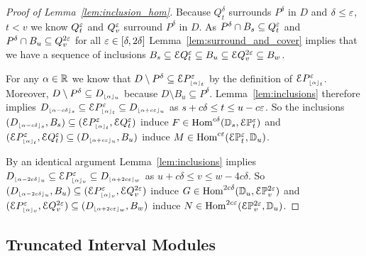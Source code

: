 \begin{proof}[Proof of Lemma~\ref{lem:inclusion_hom}]
  Because $Q_t^\delta$ surrounds $P^\delta$ in $D$ and $\delta\leq\e$, $t < v$ we know $Q_t^\e$ and $Q_v^\e$ surround $P^\delta$ in $D$.
  As $P^\delta\cap B_s\subseteq Q_t^\e$ and $P^\delta\cap B_u\subseteq Q_v^{2\e}$ for all $\e\in[\delta,2\delta]$ Lemma~\ref{lem:surround_and_cover} implies that we have a sequence of inclusions $B_s\subseteq \E Q_t^\e\subseteq B_u\subseteq \E Q_v^{2\e}\subseteq B_w$.

  For any $\alpha\in\R$ we know that $D\setminus P^\delta \subseteq \ext{P\subi{t}{\alpha}^\e}$ by the definition of $\ext{P\subi{t}{\alpha}^\e}$.
  Moreover, $D\setminus P^\delta\subseteq D\subi{u}{\alpha}$ because $D\setminus B_u\subseteq P^\delta$.
  Lemma~\ref{lem:inclusions} therefore implies $D\subi{s}{\alpha-c\delta}\subseteq \E P\subi{t}{\alpha}^\e\subseteq D\subi{u}{\alpha+c\e}$ as $s + c\delta\leq t \leq u - c\e$.
  So the inclusions $(D\subi{s}{\alpha-c\delta}, B_s)\subseteq (\E P\subi{t}{\alpha}^\e, \E Q_t^\e)$ induce $F\in\Hom^{c\delta}(\DD{s},\E\PP{t}{\e})$ and $(\E P\subi{t}{\alpha}^\e, \E Q_t^\e)\subseteq (D\subi{u}{\alpha+c\e}, B_u)$ induce $M\in \Hom^{c\e}(\E\PP{t}{\e}, \DD{u})$.

  By an identical argument Lemma~\ref{lem:inclusions} implies $D\subi{u}{\alpha-2c\delta}\subseteq \E P\subi{v}{\alpha}^\e\subseteq D\subi{w}{\alpha+2c\e}$ as $u+c\delta\leq v\leq w-4c\delta$.
  So $(D\subi{u}{\alpha-2c\delta},B_u)\subseteq (\E P\subi{v}{\alpha}^\e, \E Q_v^{2\e})$ induce $G\in\Hom^{2c\delta}(\DD{u},\E\PP{v}{2\e})$ and $(\E P\subi{v}{\alpha}^\e, \E Q_v^{2\e})\subseteq (D\subi{w}{\alpha+2c\e},B_w)$ induce $N\in\Hom^{2c\e}(\E\PP{v}{2\e},\DD{u})$.
\end{proof}

\subsection{Truncated Interval Modules}

